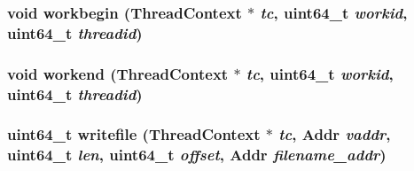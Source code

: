 \label{namespacePseudoInst_a09f94700f81d851f029c37019d7dde05}
\hypertarget{namespacePseudoInst_ac883da99bdbd438ad5d32a58f60769e9}{
\subsubsection[{workbegin}]{\setlength{\rightskip}{0pt plus 5cm}void workbegin ({\bf ThreadContext} $\ast$ {\em tc}, \/  uint64\_\-t {\em workid}, \/  uint64\_\-t {\em threadid})}}
\label{namespacePseudoInst_ac883da99bdbd438ad5d32a58f60769e9}
\hypertarget{namespacePseudoInst_ad5ecc2000334e8354f226e01727824a0}{
\subsubsection[{workend}]{\setlength{\rightskip}{0pt plus 5cm}void workend ({\bf ThreadContext} $\ast$ {\em tc}, \/  uint64\_\-t {\em workid}, \/  uint64\_\-t {\em threadid})}}
\label{namespacePseudoInst_ad5ecc2000334e8354f226e01727824a0}
\hypertarget{namespacePseudoInst_a719365f98235b44f6b4593985ece3f11}{
\subsubsection[{writefile}]{\setlength{\rightskip}{0pt plus 5cm}uint64\_\-t writefile ({\bf ThreadContext} $\ast$ {\em tc}, \/  {\bf Addr} {\em vaddr}, \/  uint64\_\-t {\em len}, \/  uint64\_\-t {\em offset}, \/  {\bf Addr} {\em filename\_\-addr})}}
\label{namespacePseudoInst_a719365f98235b44f6b4593985ece3f11}
